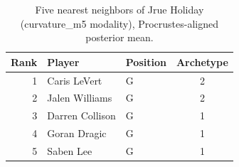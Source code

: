 \begin{table}[htbp]
  \centering\small
  \begin{tabular}{rllc}
    \toprule
    Rank & Player & Position & Archetype \\
    \midrule
    1 & Caris LeVert & G & 2 \\
    2 & Jalen Williams & G & 2 \\
    3 & Darren Collison & G & 1 \\
    4 & Goran Dragic & G & 1 \\
    5 & Saben Lee & G & 1 \\
    \bottomrule
  \end{tabular}
  \caption{Five nearest neighbors of Jrue Holiday (curvature_m5 modality), Procrustes-aligned posterior mean.}
  \label{tab:Jrue_Holiday_neighbors_curvature_m5}
\end{table}

